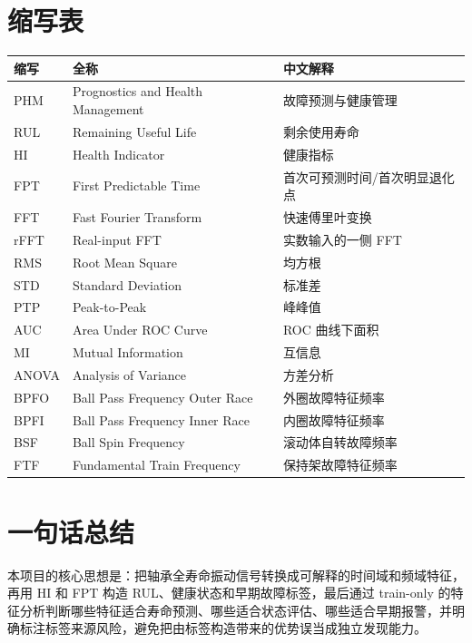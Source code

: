 \documentclass[UTF8,11pt]{ctexart}
\begin{document}
\section{缩写表}

\begin{longtable}{L{3cm}L{5cm}L{6cm}}
\toprule
缩写 & 全称 & 中文解释 \\
\midrule
\endhead
PHM & Prognostics and Health Management & 故障预测与健康管理 \\
RUL & Remaining Useful Life & 剩余使用寿命 \\
HI & Health Indicator & 健康指标 \\
FPT & First Predictable Time & 首次可预测时间/首次明显退化点 \\
FFT & Fast Fourier Transform & 快速傅里叶变换 \\
rFFT & Real-input FFT & 实数输入的一侧 FFT \\
RMS & Root Mean Square & 均方根 \\
STD & Standard Deviation & 标准差 \\
PTP & Peak-to-Peak & 峰峰值 \\
AUC & Area Under ROC Curve & ROC 曲线下面积 \\
MI & Mutual Information & 互信息 \\
ANOVA & Analysis of Variance & 方差分析 \\
BPFO & Ball Pass Frequency Outer Race & 外圈故障特征频率 \\
BPFI & Ball Pass Frequency Inner Race & 内圈故障特征频率 \\
BSF & Ball Spin Frequency & 滚动体自转故障频率 \\
FTF & Fundamental Train Frequency & 保持架故障特征频率 \\
\bottomrule
\end{longtable}

\section{一句话总结}

本项目的核心思想是：把轴承全寿命振动信号转换成可解释的时间域和频域特征，再用 HI 和 FPT 构造 RUL、健康状态和早期故障标签，最后通过 train-only 的特征分析判断哪些特征适合寿命预测、哪些适合状态评估、哪些适合早期报警，并明确标注标签来源风险，避免把由标签构造带来的优势误当成独立发现能力。
\end{document}
